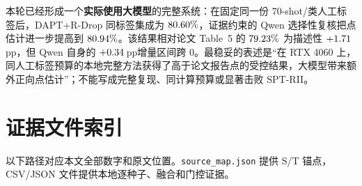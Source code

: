 \documentclass[UTF8,zihao=-4,a4paper]{ctexart}
\newcommand{\pp}{\,pp}
\begin{document}
\begin{keybox}[最终判断]
本轮已经形成一个\textbf{实际使用大模型}的完整系统：在固定同一份 70-shot/类人工标签后，DAPT+R-Drop 同标签集成为 $80.60\%$，证据约束的 Qwen 选择性复核把点估计进一步提高到 $80.94\%$。该结果相对论文 Table~5 的 $79.23\%$ 为描述性 $+1.71$\pp，但 Qwen 自身的 $+0.34$\pp 增量区间跨 0。最稳妥的表述是“在 RTX 4060 上，同人工标签预算的本地完整方法获得了高于论文报告点的受控结果，大模型带来额外正向点估计”；不能写成完整复现、同计算预算或显著击败 SPT-RII。
\end{keybox}

\section{证据文件索引}

以下路径对应本文全部数字和原文位置。\texttt{source\_map.json} 提供 S/T 锚点，CSV/JSON 文件提供本地逐种子、融合和门控证据。
\end{document}
